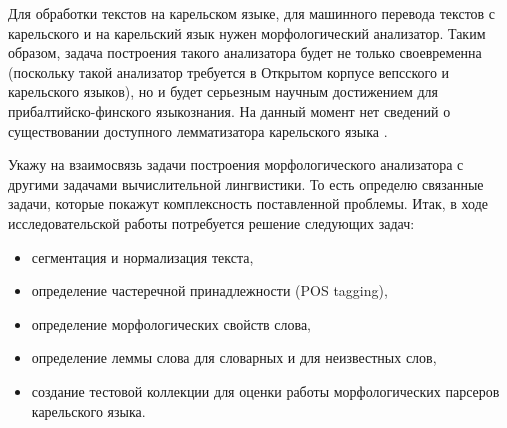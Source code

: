 Для обработки текстов на карельском языке, для машинного перевода текстов с карельского и на карельский язык нужен морфологический анализатор. Таким образом, задача построения такого анализатора будет не только своевременна (поскольку такой анализатор требуется в Открытом корпусе вепсского и карельского языков), но и будет серьезным научным достижением для прибалтийско-финского языкознания. На данный момент нет сведений о существовании доступного лемматизатора карельского языка \todo.

Укажу на взаимосвязь задачи построения морфологического анализатора с другими задачами вычислительной лингвистики. То есть определю связанные задачи, которые покажут комплексность поставленной проблемы. Итак, в ходе исследовательской работы потребуется решение следующих задач:
\begin{itemize}
\item сегментация и нормализация текста,
\item определение частеречной принадлежности (POS tagging),
\item определение морфологических свойств слова,
\item определение леммы слова для словарных и для неизвестных слов,
\item создание тестовой коллекции для оценки работы морфологических парсеров карельского языка.
\end{itemize}

